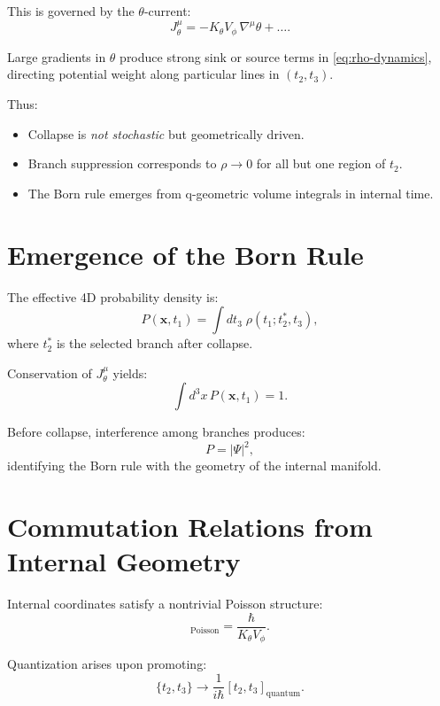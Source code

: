 \documentclass[12pt]{article}
\begin{document}
This is governed by the \(\theta\)-current:
\[
J^\mu_\theta = -K_\theta V_\phi\,\nabla^\mu\theta + \dots.
\]

Large gradients in \(\theta\) produce strong sink or source terms in
\eqref{eq:rho-dynamics}, directing potential weight along particular lines in
\((t_2,t_3)\).

Thus:
\begin{itemize}
\item Collapse is \emph{not stochastic} but geometrically driven.
\item Branch suppression corresponds to \(\rho\to 0\) for all but one region of \(t_2\).
\item The Born rule emerges from q-geometric volume integrals in internal time.
\end{itemize}


\newpage
\section{Emergence of the Born Rule}

The effective 4D probability density is:
\begin{equation}
P(\mathbf{x},t_1)
=
\int dt_3\;\rho(t_1;t_2^*,t_3),
\end{equation}
where \(t_2^*\) is the selected branch after collapse.

Conservation of \(J^\mu_\theta\) yields:
\begin{equation}
\int d^3x\,P(\mathbf{x},t_1)=1.
\end{equation}

Before collapse, interference among branches produces:
\[
P = |\Psi|^2,
\]
identifying the Born rule with the geometry of the internal manifold.


\newpage
\section{Commutation Relations from Internal Geometry}

Internal coordinates satisfy a nontrivial Poisson structure:
\begin{equation}
[t_2,t_3]_{\mathrm{Poisson}}
=
\frac{\hbar}{K_\theta V_\phi}.
\end{equation}

Quantization arises upon promoting:
\[
\{t_2,t_3\} \rightarrow \frac{1}{i\hbar}[t_2,t_3]_{\mathrm{quantum}}.
\]
\end{document}
